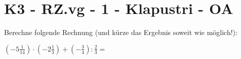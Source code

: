 \section{K3 - RZ.vg - 1 - Klapustri - OA}

\begin{beispiel}{0} %
				Berechne folgende Rechnung (und kürze das Ergebnis soweit wie möglich!):
				
				\begin{center}
				$(-5\frac{1}{14})\cdot(-2\frac{1}{3})+(-\frac{3}{4}):\frac{2}{3}=$
				\end{center}
				
\end{beispiel}